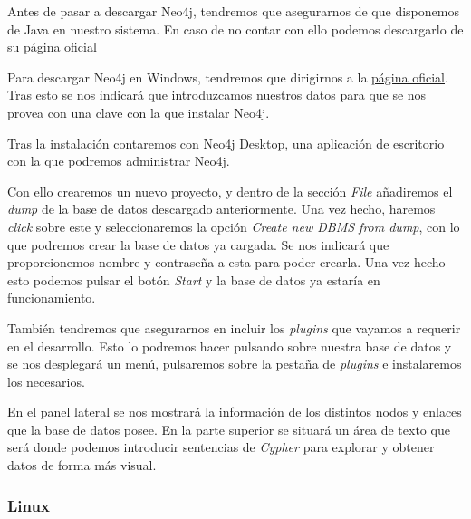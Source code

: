Antes de pasar a descargar Neo4j, tendremos que asegurarnos de que disponemos de Java en nuestro sistema. En caso de no contar con ello podemos descargarlo de su 
\href{https://www.java.com/es/download/}{página oficial}

Para descargar Neo4j en Windows, tendremos que dirigirnos a la \href{https://neo4j.com/download/}{página oficial}. Tras esto se nos indicará que introduzcamos nuestros datos para que se nos provea con una clave con la que instalar Neo4j.


Tras la instalación contaremos con Neo4j Desktop, una aplicación de escritorio con la que podremos administrar Neo4j. 




Con ello crearemos un nuevo proyecto, y dentro de la sección \textit{File} añadiremos el \textit{dump} de la base de datos descargado anteriormente. Una vez hecho, haremos \textit{click} sobre este y seleccionaremos la opción \textit{Create new DBMS from dump}, con lo que podremos crear la base de datos ya cargada. Se nos indicará que proporcionemos nombre y contraseña a esta para poder crearla. Una vez hecho esto podemos pulsar el botón \textit{Start} y la base de datos ya estaría en funcionamiento.


También tendremos que asegurarnos en incluir los \textit{plugins} que vayamos a requerir en el desarrollo. Esto lo podremos hacer pulsando sobre nuestra base de datos y se nos desplegará un menú, pulsaremos sobre la pestaña de \textit{plugins} e instalaremos los necesarios.


En el panel lateral se nos mostrará la información de los distintos nodos y enlaces que la base de datos posee. En la parte superior se situará un área de texto que será donde podemos introducir sentencias de \textit{Cypher} para explorar y obtener datos de forma más visual.



\subsubsection{Linux}


